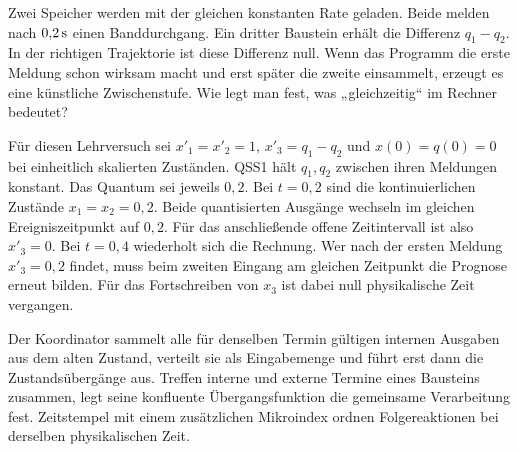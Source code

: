 Zwei Speicher werden mit der gleichen konstanten Rate geladen. Beide melden nach \(0{,}2\,\mathrm{s}\) einen Banddurchgang. Ein dritter Baustein erhält die Differenz \(q_1-q_2\). In der richtigen Trajektorie ist diese Differenz null. Wenn das Programm die erste Meldung schon wirksam macht und erst später die zweite einsammelt, erzeugt es eine künstliche Zwischenstufe. Wie legt man fest, was „gleichzeitig“ im Rechner bedeutet?

Für diesen Lehrversuch sei \(x'_1=x'_2=1\), \(x'_3=q_1-q_2\) und \(x(0)=q(0)=0\) bei einheitlich skalierten Zuständen. QSS1 hält \(q_1,q_2\) zwischen ihren Meldungen konstant. Das Quantum sei jeweils \(0{,}2\). Bei \(t=0{,}2\) sind die kontinuierlichen Zustände \(x_1=x_2=0{,}2\). Beide quantisierten Ausgänge wechseln im gleichen Ereigniszeitpunkt auf \(0{,}2\). Für das anschließende offene Zeitintervall ist also \(x'_3=0\). Bei \(t=0{,}4\) wiederholt sich die Rechnung. Wer nach der ersten Meldung \(x'_3=0{,}2\) findet, muss beim zweiten Eingang am gleichen Zeitpunkt die Prognose erneut bilden. Für das Fortschreiben von \(x_3\) ist dabei null physikalische Zeit vergangen.

Der Koordinator sammelt alle für denselben Termin gültigen internen Ausgaben aus dem alten Zustand, verteilt sie als Eingabemenge und führt erst dann die Zustandsübergänge aus. Treffen interne und externe Termine eines Bausteins zusammen, legt seine konfluente Übergangsfunktion die gemeinsame Verarbeitung fest. Zeitstempel mit einem zusätzlichen Mikroindex ordnen Folgereaktionen bei derselben physikalischen Zeit.


